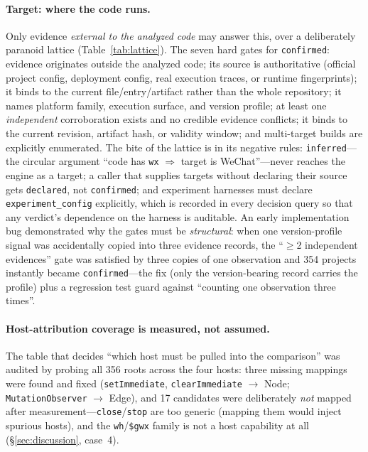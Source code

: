 \documentclass[sigconf,nonacm]{acmart}
\begin{document}
\paragraph{Target: where the code runs.} Only evidence \emph{external to the analyzed code} may answer this, over a deliberately paranoid lattice (Table~\ref{tab:lattice}). The seven hard gates for \texttt{confirmed}: evidence originates outside the analyzed code; its source is authoritative (official project config, deployment config, real execution traces, or runtime fingerprints); it binds to the current file/entry/artifact rather than the whole repository; it names platform family, execution surface, and version profile; at least one \emph{independent} corroboration exists and no credible evidence conflicts; it binds to the current revision, artifact hash, or validity window; and multi-target builds are explicitly enumerated. The bite of the lattice is in its negative rules: \texttt{inferred}---the circular argument ``code has \texttt{wx} $\Rightarrow$ target is WeChat''---never reaches the engine as a target; a caller that supplies targets without declaring their source gets \texttt{declared}, not \texttt{confirmed}; and experiment harnesses must declare \texttt{experiment\_config} explicitly, which is recorded in every decision query so that any verdict's dependence on the harness is auditable. An early implementation bug demonstrated why the gates must be \emph{structural}: when one version-profile signal was accidentally copied into three evidence records, the ``$\geq$2 independent evidences'' gate was satisfied by three copies of one observation and 354 projects instantly became \texttt{confirmed}---the fix (only the version-bearing record carries the profile) plus a regression test guard against ``counting one observation three times''.

\paragraph{Host-attribution coverage is measured, not assumed.} The table that decides ``which host must be pulled into the comparison'' was audited by probing all 356 roots across the four hosts: three missing mappings were found and fixed (\texttt{setImmediate}, \texttt{clearImmediate} $\to$ Node; \texttt{MutationObserver} $\to$ Edge), and 17 candidates were deliberately \emph{not} mapped after measurement---\texttt{close}/\texttt{stop} are too generic (mapping them would inject spurious hosts), and the \texttt{wh}/\texttt{\$gwx} family is not a host capability at all (\S\ref{sec:discussion}, case~4).
\end{document}
